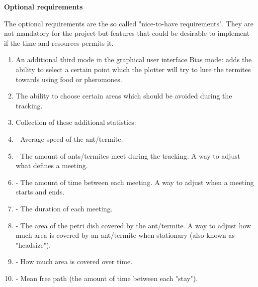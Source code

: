 \noindent \textbf{Optional requirements} \par
The optional requirements are the so called "nice-to-have requirements". They are not mandatory for the project but features that could be desirable to implement if the time and resources permits it.

\begin{enumerate}
	\item An additional third mode in the graphical user interface Bias mode: adds the ability to select a certain point which the plotter will try to lure the termites towards using food or pheromones.
    \item The ability to choose certain areas which should be avoided during the tracking.
    \item Collection of these additional statistics:
    \item - Average speed of the ant/termite.
    \item - The amount of ants/termites meet during the tracking. A way to adjust what defines a meeting.
    \item - The amount of time between each meeting. A way to adjust when a meeting starts and ends.
    \item - The duration of each meeting.
    \item - The area of the petri dish covered by the ant/termite. A way to adjust how much area is covered by an ant/termite when stationary (also known as "headsize").
    \item - How much area is covered over time.
    \item - Mean free path (the amount of time between each "stay").
\end{enumerate}



